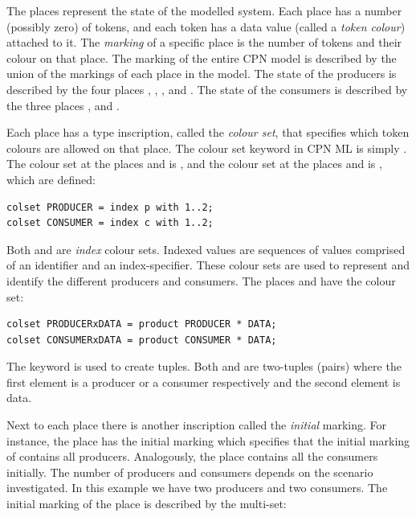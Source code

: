 The places represent the state of the modelled system. Each place has a number (possibly zero) of tokens, and each token has a data value (called a \emph{token colour}) attached to it. The \emph{marking} of a specific place is the number of tokens and their colour on that place. The marking of the entire CPN model is described by the union of the markings of each place in the model. The state of the producers is described by the four places , , , and . The state of the consumers is described by the three places ,  and . 

Each place has a type inscription, called the \emph{colour set}, that specifies which token colours are allowed on that place. The colour set keyword in CPN ML is simply . The colour set at the places  and  is , and the colour set at the places  and  is , which are defined:

\begin{verbatim}
colset PRODUCER = index p with 1..2;
colset CONSUMER = index c with 1..2;
\end{verbatim}

\noindent
Both  and  are \emph{index} colour sets. Indexed values are sequences of values comprised of an identifier and an index-specifier. These colour sets are used to represent and identify the different producers and consumers. The places  and  have the colour set:

\begin{verbatim}
colset PRODUCERxDATA = product PRODUCER * DATA; 
colset CONSUMERxDATA = product CONSUMER * DATA;
\end{verbatim}

\noindent
The  keyword is used to create tuples. Both  and  are two-tuples (pairs) where the first element is a producer or a consumer respectively and the second element is data.

Next to each place there is another inscription called the \emph{initial} marking. For instance, the place  has the initial marking  which specifies that the initial marking of  contains all producers. Analogously, the place  contains all the consumers initially. The number of producers and consumers depends on the scenario investigated. In this example we have two producers and two consumers. The initial marking of the place  is described by the multi-set:

